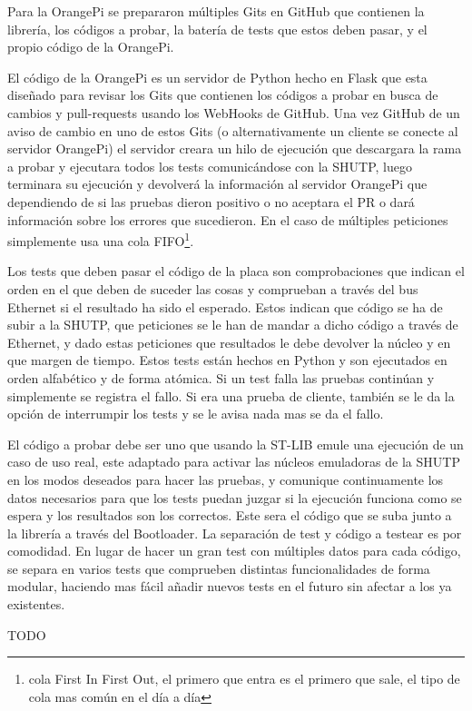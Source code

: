 \documentclass{report}
\begin{document}
Para la OrangePi se prepararon múltiples Gits en GitHub que contienen la librería, los códigos a probar, la batería de tests que estos deben pasar, y el propio código de la OrangePi. \par
El código de la OrangePi es un servidor de Python hecho en Flask que esta diseñado para revisar los Gits que contienen los códigos a probar en busca de cambios y pull-requests usando los WebHooks de GitHub. Una vez GitHub de un aviso de cambio en uno de estos Gits (o alternativamente un cliente se conecte al servidor OrangePi) el servidor creara un hilo de ejecución que descargara la rama a probar y ejecutara todos los tests comunicándose con la SHUTP, luego terminara su ejecución y devolverá la información al servidor OrangePi que dependiendo de si las pruebas dieron positivo o no aceptara el PR o dará información sobre los errores que sucedieron. En el caso de múltiples peticiones simplemente usa una cola FIFO\footnote{cola First In First Out, el primero que entra es el primero que sale, el tipo de cola mas común en el día a día}. \par
Los tests que deben pasar el código de la placa son comprobaciones que indican el orden en el que deben de suceder las cosas y comprueban a través del bus Ethernet si el resultado ha sido el esperado. Estos indican que código se ha de subir a la SHUTP, que peticiones se le han de mandar a dicho código a través de Ethernet, y dado estas peticiones que resultados le debe devolver la núcleo y en que margen de tiempo. Estos tests están hechos en Python y son ejecutados en orden alfabético y de forma atómica. Si un test falla las pruebas continúan y simplemente se registra el fallo. Si era una prueba de cliente, también se le da la opción de interrumpir los tests y se le avisa nada mas se da el fallo. \par
El código a probar debe ser uno que usando la ST-LIB emule una ejecución de un caso de uso real, este adaptado para activar las núcleos emuladoras de la SHUTP en los modos deseados para hacer las pruebas, y comunique continuamente los datos necesarios para que los tests puedan juzgar si la ejecución funciona como se espera y los resultados son los correctos. Este sera el código que se suba junto a la librería a través del Bootloader. La separación de test y código a testear es por comodidad. En lugar de hacer un gran test con múltiples datos para cada código, se separa en varios tests que comprueben distintas funcionalidades de forma modular, haciendo mas fácil añadir nuevos tests en el futuro sin afectar a los ya existentes.
\par \vspace{0.3cm}

TODO




\end{document}
